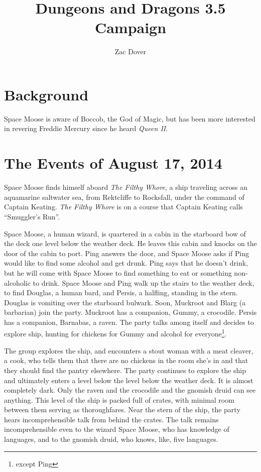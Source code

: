 \documentclass{article}
\title{Dungeons and Dragons 3.5 Campaign}
\author{Zac Dover}
\begin{document}
\maketitle

\section{Background}

Space Moose is aware of Boccob, the God of Magic, but has been more interested in revering Freddie Mercury since he heard \textit{Queen II}.

\section{The Events of August 17, 2014}
Space Moose finds himself aboard \textit{The Filthy Whore}, a ship traveling across an aquamarine saltwater sea, from Rektcliffe to Rocksfall, under the command of Captain Keating. \textit{The Filthy Whore} is on a course that Captain Keating calls ``Smuggler's Run''.

Space Moose, a human wizard, is quartered in a cabin in the starboard bow of the deck one level below the weather deck. He leaves this cabin and knocks on the door of the cabin to port. Ping answers the door, and Space Moose asks if Ping would like to find some alcohol and get drunk. Ping says that he doesn't drink, but he will come with Space Moose to find something to eat or something non-alcoholic to drink. Space Moose and Ping walk up the stairs to the weather deck, to find Douglas, a human bard, and Persis, a halfling, standing in the stern. Douglas is vomiting over the starboard bulwark. Soon, Muckroot and Blarg (a barbarian) join the party. Muckroot has a companion, Gummy, a crocodile. Persis has a companion, Barnabas, a raven. The party talks among itself and decides to explore ship, hunting for chickens for Gummy and alcohol for everyone\footnote{except Ping}.

The group explores the ship, and encounters a stout woman with a meat cleaver, a cook,  who tells them that there are no chickens in the room she's in and that they should find the pantry elsewhere. The party continues to explore the ship and ultimately enters a level below the level below the weather deck. It is almost completely dark. Only the raven and the crocodile and the gnomish druid can see anything.  This level of the ship is packed full of crates, with minimal room between them serving as thoroughfares. Near the stern of the ship, the party hears incomprehensible talk from behind the crates. The talk remains incomprehensible even to the wizard Space Moose, who has knowledge of languages, and to the gnomish druid, who knows, like, five languages. 
\end{document}
